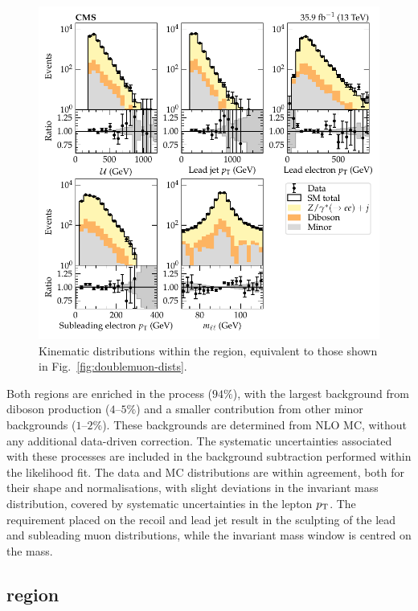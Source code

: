 \begin{figure}[htb]
    \centering
    \includegraphics{chapters/043_results/images/doubleelectron_dists.pdf}
    \caption[Dielectron kinematics.]{
        Kinematic distributions within the \dieleplusjets region, equivalent to those shown in Fig.~\ref{fig:doublemuon-dists}.
    }
    \label{fig:doubleelectron-dists}
\end{figure}
%
Both regions are enriched in the \IDYllj process ($94\%$), with the largest
background from diboson production ($4$--$5\%$) and a smaller contribution
from other minor backgrounds ($1$--$2\%$). These backgrounds are determined
from NLO MC, without any additional data-driven correction. The systematic
uncertainties associated with these processes are included in the background
subtraction performed within the likelihood fit. The data and MC distributions
are within agreement, both for their shape and normalisations, with slight
deviations in the invariant mass distribution, covered by systematic
uncertainties in the lepton $p_{\text{T}}$. The requirement placed on the recoil and lead jet \pt
result in the sculpting of the lead and subleading muon
distributions, while the invariant mass window is centred on the \PZ mass.


\subsection{\metplusjets region}

